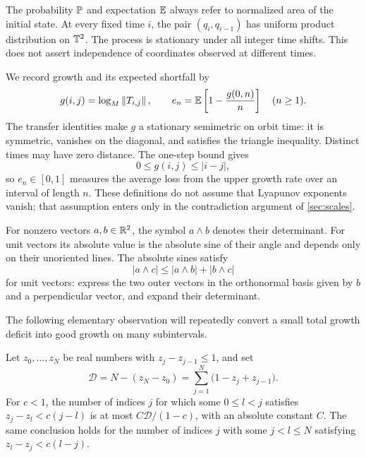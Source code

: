 The probability $\mathbb{P}$ and expectation $\mathbb{E}$ always refer to normalized
area of the initial state. At every fixed time $i$, the pair
$(q_i,q_{i-1})$ has uniform product distribution on $\mathbb{T}^2$.
The process is stationary under all integer time shifts. This does not
assert independence of coordinates observed at different times.

We record growth and its expected shortfall by
\begin{equation}\label{scale:distance-deficit}
 g(i,j)=\log_M\left\lVert T_{i,j}\right\rVert,\qquad
 e_n=\mathbb{E}\left[1-\frac{g(0,n)}n\right]\quad(n\ge1).
\end{equation}
The transfer identities make $g$ a stationary semimetric on orbit time:
it is symmetric, vanishes on the diagonal, and satisfies the triangle
inequality. Distinct times may have zero distance. The one-step bound gives
\begin{equation}\label{scale:distance-bound}
 0\le g(i,j)\le|i-j|,
\end{equation}
so $e_n\in[0,1]$ measures the average loss from the upper growth rate
over an interval of length $n$. These definitions do not assume that
Lyapunov exponents vanish; that assumption enters only in the
contradiction argument of \cref{sec:scales}.

For nonzero vectors $a,b\in\mathbb{R}^2$, the symbol $a\wedge b$ denotes their
determinant. For unit vectors its absolute value is the absolute sine
of their angle and depends only on their unoriented lines. The absolute
sines satisfy
\begin{equation}\label{setup:sine-triangle}
 |a\wedge c|\le |a\wedge b|+|b\wedge c|
\end{equation}
for unit vectors: express the two outer vectors in the orthonormal basis
given by $b$ and a perpendicular vector, and expand their determinant.

The following elementary observation will repeatedly convert a small
total growth deficit into good growth on many subintervals.

\begin{lemma}\label{setup:shortfall-count}
Let $z_0,\ldots,z_N$ be real numbers with $z_j-z_{j-1}\le1$, and set
\[
 \mathcal D=N-(z_N-z_0)
 =\sum_{j=1}^N\bigl(1-z_j+z_{j-1}\bigr).
\]
For $c<1$, the number of indices $j$ for which some $0\le l<j$ satisfies
$z_j-z_l<c(j-l)$ is at most $C\mathcal D/(1-c)$, with an absolute
constant $C$. The same conclusion holds for the number of indices $j$
with some $j<l\le N$ satisfying $z_l-z_j<c(l-j)$.
\end{lemma}

